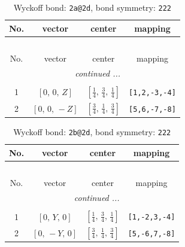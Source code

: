 \documentclass[fleqn,8pt]{jsarticle}
\begin{document}
\begin{longtable}{cccc}
\caption{Wyckoff bond: {\tt 2a@2d}, bond symmetry: {\tt 222}}
 \\
 \hline \hline
No. & vector & center & mapping \\ \hline \endfirsthead

\multicolumn{3}{l}{\tablename\ \thetable{}} \\
 \hline \hline
No. & vector & center & mapping \\ \hline \endhead

 \hline \hline
\multicolumn{3}{r}{\footnotesize\it continued ...} \\ \endfoot

 \hline \hline
\multicolumn{3}{r}{} \\ \endlastfoot

1 & $\left[ 0,\, 0,\, Z \right]$ & $\left[ \frac{1}{4},\, \frac{3}{4},\, \frac{1}{4} \right]$ & {\tt [1,2,-3,-4]} \\ \hline
2 & $\left[ 0,\, 0,\, - Z \right]$ & $\left[ \frac{3}{4},\, \frac{1}{4},\, \frac{3}{4} \right]$ & {\tt [5,6,-7,-8]} \\
\end{longtable}
\renewcommand{\arraystretch}{1.2}
\begin{longtable}{cccc}
\caption{Wyckoff bond: {\tt 2b@2d}, bond symmetry: {\tt 222}}
 \\
 \hline \hline
No. & vector & center & mapping \\ \hline \endfirsthead

\multicolumn{3}{l}{\tablename\ \thetable{}} \\
 \hline \hline
No. & vector & center & mapping \\ \hline \endhead

 \hline \hline
\multicolumn{3}{r}{\footnotesize\it continued ...} \\ \endfoot

 \hline \hline
\multicolumn{3}{r}{} \\ \endlastfoot

1 & $\left[ 0,\, Y,\, 0 \right]$ & $\left[ \frac{1}{4},\, \frac{3}{4},\, \frac{1}{4} \right]$ & {\tt [1,-2,3,-4]} \\ \hline
2 & $\left[ 0,\, - Y,\, 0 \right]$ & $\left[ \frac{3}{4},\, \frac{1}{4},\, \frac{3}{4} \right]$ & {\tt [5,-6,7,-8]} \\
\end{longtable}
\renewcommand{\arraystretch}{1.2}
\end{document}
